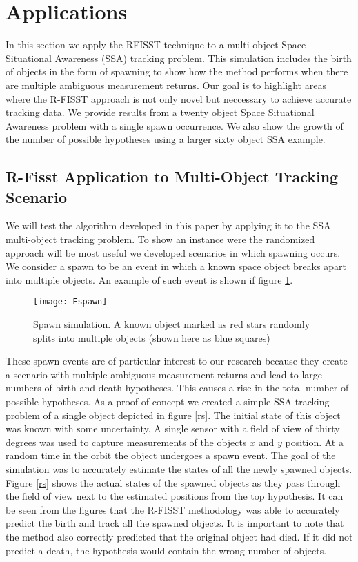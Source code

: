 \documentclass[10pt, conference]{IEEEtran}
\begin{document}
\section{Applications}
In this section we apply the RFISST technique to a multi-object Space Situational Awareness (SSA) tracking problem. This simulation includes the birth of objects in the form of spawning to show how the method performs when there are multiple ambiguous measurement returns. Our goal is to highlight areas where the R-FISST approach is not only novel but neccessary to achieve accurate tracking data. We provide results from a twenty object Space Situational Awareness problem with a single spawn occurrence. We also show the growth of the number of possible hypotheses using a larger sixty object SSA example.

\subsection{R-Fisst Application to Multi-Object Tracking Scenario}
We will test the algorithm developed in this paper by applying it to the SSA multi-object tracking problem. To show an instance were the randomized approach will be most useful we developed scenarios in which spawning occurs. We consider a spawn to be an event in which a known space object breaks apart into multiple objects. An example of such event is shown if figure \ref{Spawn}.

\begin{figure}[h]
\centering
\texttt{[image: Fspawn]}
\caption{Spawn simulation. A known object marked as red stars randomly splits into multiple objects (shown here as blue squares)}
\label{Spawn}
\end{figure}

These spawn events are of particular interest to our research because they create a scenario with multiple ambiguous measurement returns and lead to large numbers of birth and death hypotheses. This causes a rise in the total number of possible hypotheses. As a proof of concept we created a simple SSA tracking problem of a single object depicted in figure \ref{rs}. The initial state of this object was known with some uncertainty. A single sensor with a field of view of thirty degrees was used to capture measurements of the objects $x$ and $y$ position. At a random time in the orbit the object undergoes a spawn event. The goal of the simulation was to accurately estimate the states of all the newly spawned objects. Figure \ref{rs} shows the actual states of the spawned objects as they pass through the field of view next to the estimated positions from the top hypothesis. It can be seen from the figures that the R-FISST methodology was able to accurately predict the birth and track all the spawned objects. It is important to note that the method also correctly predicted that the original object had died. If it did not predict a death, the hypothesis would contain the wrong number of objects.
\end{document}
